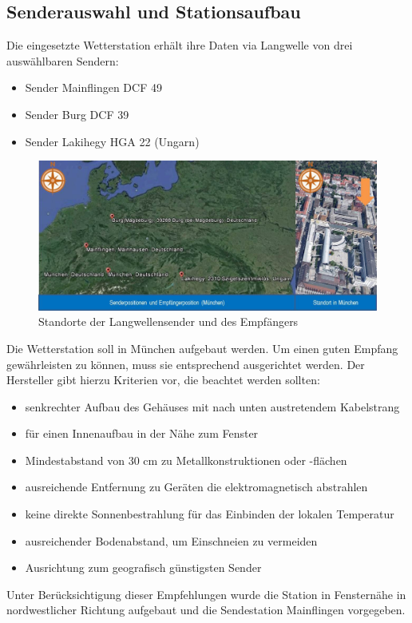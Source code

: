 \subsection{Senderauswahl und Stationsaufbau}
Die eingesetzte Wetterstation erhält ihre Daten via Langwelle von drei auswählbaren Sendern:
\begin{itemize}
\item Sender Mainflingen DCF 49
\item Sender Burg DCF 39
\item Sender Lakihegy HGA 22 (Ungarn)
\end{itemize}
\begin{figure}[h]
\centering
\includegraphics[scale=0.65]{weatherstation/Empfaengerausrichtung}
\caption{Standorte der Langwellensender und des Empfängers}
\label{fig:3}
\end{figure}
Die Wetterstation soll in München aufgebaut werden. Um einen guten Empfang gewährleisten zu können, muss sie entsprechend ausgerichtet werden. Der Hersteller gibt hierzu Kriterien vor, die beachtet werden sollten:
\begin{itemize}
\item senkrechter Aufbau des Gehäuses mit nach unten austretendem Kabelstrang
\item für einen Innenaufbau in der Nähe zum Fenster
\item Mindestabstand von 30 cm zu Metallkonstruktionen oder -flächen
\item ausreichende Entfernung zu Geräten die elektromagnetisch abstrahlen
\item keine direkte Sonnenbestrahlung für das Einbinden der lokalen Temperatur
\item ausreichender Bodenabstand, um Einschneien zu vermeiden
\item Ausrichtung zum geografisch günstigsten Sender
\end{itemize} 
Unter Berücksichtigung dieser Empfehlungen wurde die Station in Fensternähe in nordwestlicher Richtung aufgebaut und die Sendestation Mainflingen vorgegeben.
